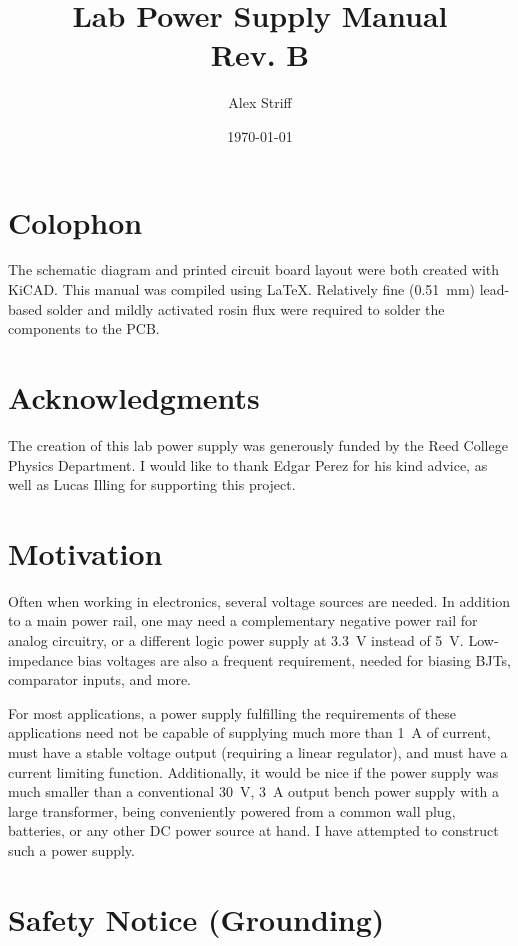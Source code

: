 \documentclass[letterpaper,twocolumn,11pt]{article}
\title{Lab Power Supply Manual \\ \large Rev. B}
\author{Alex Striff}
\date{\today}
\begin{document}
\maketitle
\tableofcontents
\listoftables
\thispagestyle{empty}

\section*{Colophon}

The schematic diagram and printed circuit board layout were both created with
KiCAD. This manual was compiled using \LaTeX. Relatively fine (\SI{0.51}{\mm})
lead-based solder and mildly activated rosin flux were required to solder the
components to the PCB.

\section{Acknowledgments}

The creation of this lab power supply was generously funded by the Reed College
Physics Department. I would like to thank Edgar Perez for his kind advice, as
well as Lucas Illing for supporting this project.

\section{Motivation}

Often when working in electronics, several voltage sources are needed. In
addition to a main power rail, one may need a complementary negative power rail
for analog circuitry, or a different logic power supply at \SI{3.3}{\V} instead
of \SI{5}{\V}. Low-impedance bias voltages are also a frequent requirement,
needed for biasing BJTs, comparator inputs, and more.

For most applications, a power supply fulfilling the requirements of these
applications need not be capable of supplying much more than \SI{1}{\A} of
current, must have a stable voltage output (requiring a linear regulator), and
must have a current limiting function.  Additionally, it would be nice if the
power supply was much smaller than a conventional \SI{30}{\V}, \SI{3}{\A} output
bench power supply with a large transformer, being conveniently powered from a
common wall plug, batteries, or any other DC power source at hand. I have
attempted to construct such a power supply.

\section{Safety Notice (Grounding)}
\end{document}

